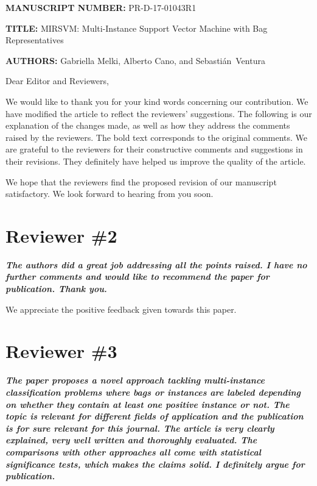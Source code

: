 \documentclass[a4paper,notitlepage]{article}
\begin{document}
\noindent \textbf{\small MANUSCRIPT NUMBER:} PR-D-17-01043R1

\noindent \textbf{\small TITLE:} {\small MIRSVM: Multi-Instance Support Vector Machine with Bag Representatives}

\noindent \textbf{\small AUTHORS:} {\small Gabriella Melki, Alberto Cano, and Sebasti\'{a}n~Ventura}

\bigskip

\noindent Dear Editor and Reviewers,

\noindent We would like to thank you for your kind words concerning our contribution. We have modified the article to reflect the reviewers' suggestions. The following is our explanation of the changes made, as well as how they address the comments raised by the reviewers. The bold text corresponds to the original comments. We are grateful to the reviewers for their constructive comments and suggestions in their revisions. They definitely have helped us improve the quality of the article.

\noindent We hope that the reviewers find the proposed revision of our manuscript satisfactory. We look forward to hearing from you soon.

\section{Reviewer \#2}

\noindent \textbf{\textit{The authors did a great job addressing all the points raised. I have no further comments and would like to recommend the paper for publication. Thank you. }}

\noindent We appreciate the positive feedback given towards this paper.

\section{Reviewer \#3}

\noindent \textbf{\textit{The paper proposes a novel approach tackling multi-instance classification problems where bags or instances are labeled depending on whether they contain at least one positive instance or not. The topic is relevant for different fields of application and the publication is for sure relevant for this journal. The article is very clearly explained, very well written and thoroughly evaluated. The comparisons with other approaches all come with statistical significance tests, which makes the claims solid. I definitely argue for publication.}}
\end{document}
